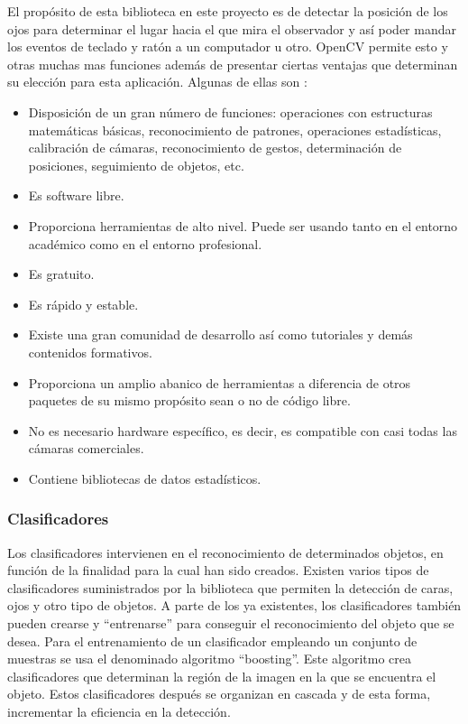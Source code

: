El propósito de esta biblioteca en este proyecto es de detectar la posición de los ojos para determinar el lugar hacia el que mira el observador y así poder mandar los eventos de teclado y ratón a un computador u otro. OpenCV permite esto y otras muchas mas funciones además de presentar ciertas ventajas que determinan su elección para esta aplicación. Algunas de ellas son \citep{arevalo2004libreria}:
\begin{itemize}
\item Disposición de un gran número de funciones: operaciones con estructuras matemáticas básicas, reconocimiento de patrones, operaciones estadísticas, calibración de cámaras, reconocimiento de gestos, determinación de posiciones, seguimiento de objetos, etc. 
\item Es software libre.
\item Proporciona herramientas de alto nivel. Puede ser usando tanto en el entorno académico como en el entorno profesional. 
\item Es gratuito.
\item Es rápido y estable.
\item Existe una gran comunidad de desarrollo así como tutoriales y demás contenidos formativos.
\item Proporciona un amplio abanico de herramientas a diferencia de otros paquetes de su mismo propósito sean o no de código libre.
\item No es necesario hardware específico, es decir, es compatible con casi todas las cámaras comerciales.
\item Contiene bibliotecas de datos estadísticos.
\end{itemize}


\subsubsection{Clasificadores}\label{s2_2_1_1}

Los clasificadores intervienen en el reconocimiento de determinados objetos, en función de la finalidad para la cual han sido creados. Existen varios tipos de clasificadores suministrados por la biblioteca que permiten la detección de caras, ojos y otro tipo de objetos.
 A parte de los ya existentes, los clasificadores también pueden crearse y ``entrenarse'' para conseguir el reconocimiento del objeto que se desea. Para el entrenamiento de un clasificador empleando un conjunto de muestras se usa el denominado algoritmo ``boosting''. Este algoritmo crea clasificadores que determinan la región de la imagen en la que se encuentra el objeto. Estos clasificadores después se organizan en cascada y de esta forma, incrementar la eficiencia en la detección.

